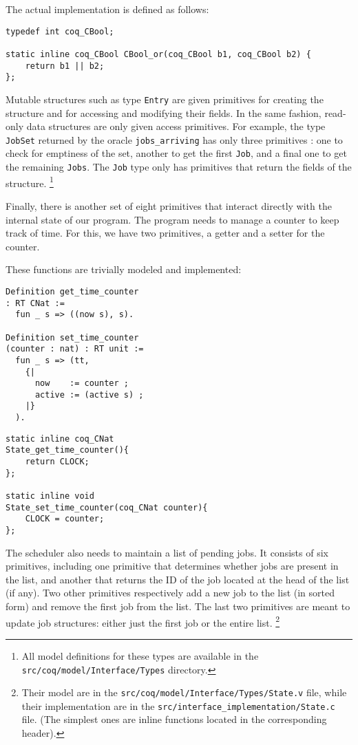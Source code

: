 	The actual implementation is defined as follows:

	\begin{verbatim}
typedef int coq_CBool;

static inline coq_CBool CBool_or(coq_CBool b1, coq_CBool b2) {
    return b1 || b2;
};
	\end{verbatim}

	Mutable structures such as type \texttt{Entry} are given primitives for creating the structure and for accessing and modifying their fields. In the same fashion, read-only data structures are only given access primitives. For example, the type \texttt{JobSet} returned by the oracle \texttt{jobs\_arriving} has only three primitives : one to check for emptiness of the set, another to get the first \texttt{Job}, and a final one to get the remaining \texttt{Jobs}. The \texttt{Job} type only has primitives that return the fields of the structure. \footnote{All model definitions for these types are available in the \texttt{src/coq/model/Interface/Types} directory.}


	Finally, there is another set of eight primitives that interact directly with the internal state of our program. The program needs to manage a counter to keep track of time. For this, we have two primitives, a getter and a setter for the counter.

	These functions are trivially modeled and implemented:

	\begin{verbatim}
Definition get_time_counter
: RT CNat :=
  fun _ s => ((now s), s).

Definition set_time_counter
(counter : nat) : RT unit :=
  fun _ s => (tt,
    {|
      now    := counter ;
      active := (active s) ;
    |}
  ).
	\end{verbatim}

	\begin{verbatim}
static inline coq_CNat
State_get_time_counter(){
    return CLOCK;
};

static inline void
State_set_time_counter(coq_CNat counter){
    CLOCK = counter;
};
	\end{verbatim}
	The scheduler also needs to maintain a list of pending jobs. It consists of six primitives, including one primitive that determines whether jobs are present in the list, and another that returns the ID of the job located at the head of the list (if any). Two other primitives respectively add a new job to the list (in sorted form) and remove the first job from the list. The last two primitives are meant to update job structures: either just the first job or the entire list. \footnote{Their model are in the \texttt{src/coq/model/Interface/Types/State.v} file, while their implementation are in the \texttt{src/interface\_implementation/State.c} file. (The simplest ones are inline functions located in the corresponding header).}

